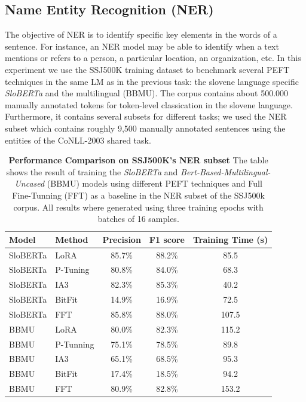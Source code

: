 \documentclass[fleqn,moreauthors,10pt]{ds_report}
\begin{document}
\subsection{Name Entity Recognition (NER)}
The objective of NER is to identify specific key elements in the words of a sentence. For instance, an NER model may be able to identify when a text mentions or refers to a person, a particular location, an organization, etc. In this experiment we use the SSJ500K training dataset to benchmark several PEFT techniques in the same LM as in the previous task: the slovene language specific \textit{SloBERTa} and the multilingual  (BBMU). The corpus contains about 500.000 manually annotated tokens for token-level classication in the slovene language. Furthermore, it contains several subsets for different tasks; we used the NER subset which contains roughly 9,500 manually annotated sentences using the entities of the CoNLL-2003 shared task. 

\begin{table}[ht]
\centering
\caption{\textbf{Performance Comparison on SSJ500K's NER subset} The table shows the result of training the {\it SloBERTa} and {\it Bert-Based-Multilingual-Uncased} (BBMU) models using different PEFT techniques and Full Fine-Tunning (FFT) as a baseline in the NER subset of the SSJ500k corpus. All results where generated using three training epochs with batches of 16 samples.}
\label{tab:ner_results}
\small
\begin{tabular}{@{}llccc@{}}
\toprule
Model & Method & Precision & F1 score & Training Time (s)\\ \midrule
SloBERTa & LoRA & 85.7\% & 88.2\% & 85.5 \\
SloBERTa & P-Tuning & 80.8\% & 84.0\% & 68.3 \\
SloBERTa & IA3 & 82.3\% & 85.3\% & 40.2 \\
SloBERTa & BitFit & 14.9\% & 16.9\% & 72.5\\
SloBERTa & FFT & 85.8\% & 88.0\% & 107.5 \\
BBMU & LoRA & 80.0\% & 82.3\% & 115.2 \\
BBMU & P-Tunning & 75.1\% & 78.5\% & 89.8 \\
BBMU & IA3 & 65.1\% & 68.5\% & 95.3 \\
BBMU & BitFit & 17.4\% & 18.5\% & 94.2\\
BBMU & FFT & 80.9\% & 82.8\% & 153.2 \\
\bottomrule
\end{tabular}
\end{table}
\end{document}
